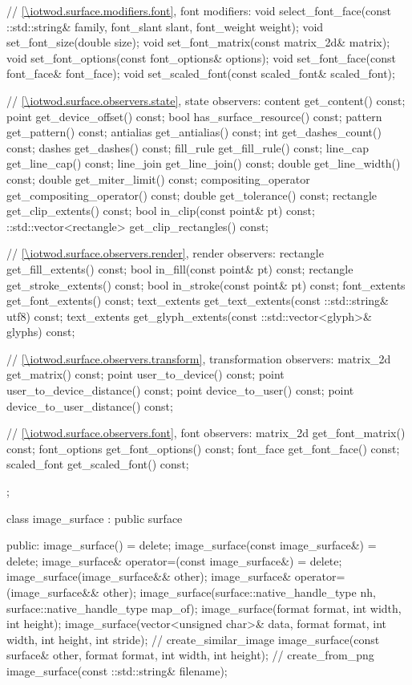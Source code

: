 \begin{codeblock}
{{{{{    // \ref{\iotwod.surface.modifiers.font}, font modifiers:
    void select_font_face(const ::std::string& family, font_slant slant, 
      font_weight weight);
    void set_font_size(double size);
    void set_font_matrix(const matrix_2d& matrix);
    void set_font_options(const font_options& options);
    void set_font_face(const font_face& font_face);
    void set_scaled_font(const scaled_font& scaled_font);

    // \ref{\iotwod.surface.observers.state}, state observers:
    content get_content() const;
    point get_device_offset() const;
    bool has_surface_resource() const;
    pattern get_pattern() const;
    antialias get_antialias() const;
    int get_dashes_count() const;
    dashes get_dashes() const;
    fill_rule get_fill_rule() const;
    line_cap get_line_cap() const;
    line_join get_line_join() const;
    double get_line_width() const;
    double get_miter_limit() const;
    compositing_operator get_compositing_operator() const;
    double get_tolerance() const;
    rectangle get_clip_extents() const;
    bool in_clip(const point& pt) const;
    ::std::vector<rectangle> get_clip_rectangles() const;

    // \ref{\iotwod.surface.observers.render}, render observers:
    rectangle get_fill_extents() const;
    bool in_fill(const point& pt) const;
    rectangle get_stroke_extents() const;
    bool in_stroke(const point& pt) const;
    font_extents get_font_extents() const;
    text_extents get_text_extents(const ::std::string& utf8) const;
    text_extents get_glyph_extents(const ::std::vector<glyph>& glyphs) const;

    // \ref{\iotwod.surface.observers.transform}, transformation observers:
    matrix_2d get_matrix() const;
    point user_to_device() const;
    point user_to_device_distance() const;
    point device_to_user() const;
    point device_to_user_distance() const;

    // \ref{\iotwod.surface.observers.font}, font observers:
    matrix_2d get_font_matrix() const;
    font_options get_font_options() const;
    font_face get_font_face() const;
    scaled_font get_scaled_font() const;
  };

  class image_surface : public surface {
  public:
    image_surface() = delete;
    image_surface(const image_surface&) = delete;
    image_surface& operator=(const image_surface&) = delete;
    image_surface(image_surface&& other);
    image_surface& operator=(image_surface&& other);
    image_surface(surface::native_handle_type nh, surface::native_handle_type 
    map_of);
    image_surface(format format, int width, int height);
    image_surface(vector<unsigned char>& data, format format, int width, int 
    height, int stride);
    // create_similar_image
    image_surface(const surface& other, format format, int width, int height);
    // create_from_png
    image_surface(const ::std::string& filename);

}}}}}
\end{codeblock}
